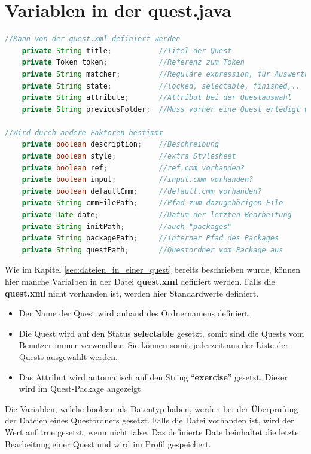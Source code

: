 \section{Variablen in der quest.java}
\begin{lstlisting}[language=JAVA]
//Kann von der quest.xml definiert werden
	private String title;			//Titel der Quest		
	private Token token;			//Referenz zum Token
	private String matcher;			//Reguläre expression, für Auswertung benötigt
	private String state;			//locked, selectable, finished,..
	private String attribute;		//Attribut bei der Questauswahl
	private String previousFolder;	//Muss vorher eine Quest erledigt werden

//Wird durch andere Faktoren bestimmt
	private boolean description;	//Beschreibung
	private boolean style;			//extra Stylesheet
	private boolean ref;			//ref.cmm vorhanden?
	private boolean input;			//input.cmm vorhanden?	
	private boolean defaultCmm;		//default.cmm vorhanden?
	private String cmmFilePath;		//Pfad zum dazugehörigen File	
	private Date date;				//Datum der letzten Bearbeitung
	private String initPath;		//auch "packages"
	private String packagePath;		//interner Pfad des Packages
	private String questPath;		//Questordner vom Package aus

\end{lstlisting}
Wie im Kapitel \ref{sec:dateien_in_einer_quest} bereits beschrieben wurde, können hier manche Varialben in der Datei \textbf{quest.xml} definiert werden. Falls die \textbf{quest.xml} nicht vorhanden ist, werden hier Standardwerte definiert.

\begin{itemize}
\item Der Name der Quest wird anhand des Ordnernamens definiert.
\item Die Quest wird auf den Status \textbf{selectable} gesetzt, somit sind die Quests vom Benutzer immer verwendbar. Sie können somit jederzeit aus der Liste der Quests ausgewählt werden.
\item Das Attribut wird automatisch auf den String "`\textbf{exercise}"' gesetzt. Dieser wird im Quest-Package angezeigt.
\end{itemize}

Die Variablen, welche boolean als Datentyp haben, werden bei der Überprüfung der Dateien eines Questordners gesetzt. Falls die Datei vorhanden ist, wird der Wert auf true gesetzt, wenn nicht false. Das definierte Date beinhaltet die letzte Bearbeitung einer Quest und wird im Profil gespeichert.

